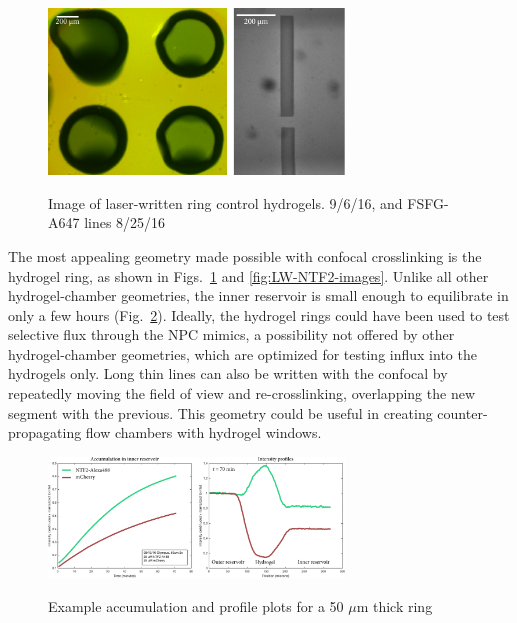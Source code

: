 \begin{figure} %
\caption{Image of laser-written ring control hydrogels. 9/6/16, and FSFG-A647 lines 8/25/16}
\centering
\includegraphics[width=0.7\textwidth]{figs/ch03/example-LW-gels}
\label{fig:LW-gel-images}
\end{figure} %

The most appealing geometry made possible with confocal crosslinking is the hydrogel ring, as shown in Figs.~\ref{fig:LW-gel-images} and \ref{fig:LW-NTF2-images}.  Unlike all other hydrogel-chamber geometries, the inner reservoir is small enough to equilibrate in only a few hours (Fig.~\ref{fig:ring-acc-and-profile}).  Ideally, the hydrogel rings could have been used to test selective flux through the NPC mimics, a possibility not offered by other hydrogel-chamber geometries, which are optimized for testing influx into the hydrogels only.  Long thin lines can also be written with the confocal by repeatedly moving the field of view and re-crosslinking, overlapping the new segment with the previous.  This geometry could be useful in creating counter-propagating flow chambers with hydrogel windows.

\begin{figure} %
\caption{Example accumulation and profile plots for a 50 $\mu$m thick ring}
\centering
\includegraphics[width=0.7\textwidth]{figs/ch03/ring-acc-and-profile}
\label{fig:ring-acc-and-profile}
\end{figure} %


